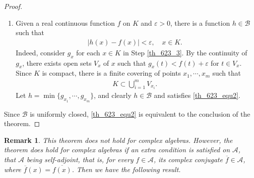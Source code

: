 \documentclass[10pt]{book}
\newtheorem{remark}{Remark}[chapter]
\theoremstyle{definition}
\numberwithin{equation}{chapter}
\begin{document}
\begin{proof}
\begin{enumerate}[label=(\Roman*)]
    \item Given a real continuous function $f$ on $K$ and $\varepsilon > 0$, there is a function $h \in \mathscr{B}$ such that
    \begin{align}\label{th_623_equ2}
        \left|h(x) - f(x)\right| < \varepsilon, \quad x \in K.
    \end{align}
    Indeed, consider $g_x$ for each $x \in K$ in Step \ref{th_623_3}. By the continuity of $g_x$, there exists open sets $V_x$ of $x$ such that $g_x(t) < f(t) + \varepsilon$ for $t \in V_x$. Since $K$ is compact, there is a finite covering of points $x_1, \cdots, x_m$ such that
    \begin{align*}
        K \subset \bigcup^m_{i=1} V_{x_i}.
    \end{align*}
    Let $h = \min \{g_{x_1}, \cdots, g_{x_m}\}$, and clearly $h \in \mathscr{B}$ and satisfies \eqref{th_623_equ2}.
\end{enumerate}
Since $\mathscr{B}$ is uniformly closed, \eqref{th_623_equ2} is equivalent to the conclusion of the theorem.
\end{proof}

\medskip

\begin{remark}
This theorem does not hold for complex algebras. However, the theorem does hold for complex algebras if an extra condition is satisfied on $\mathscr{A}$, that $\mathscr{A}$ being self-adjoint, that is, for every $f \in \mathscr{A}$, its complex conjugate $\overline{f} \in \mathscr{A}$, where $\overline{f}(x) = \overline{f(x)}$. Then we have the following result.
\end{remark}

\medskip
\end{document}
